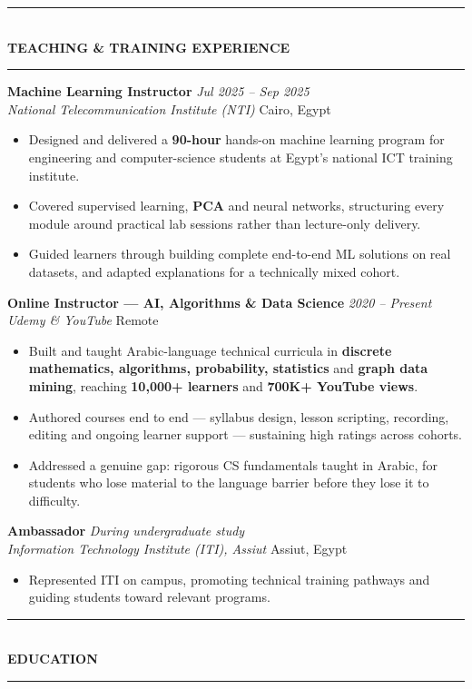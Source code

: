\documentclass[10pt, a4paper]{article}
\newcommand{\cvsection}[1]{%
  \vspace{3pt}%
  {\color{navy}\rule{\linewidth}{1.1pt}}\\[0.5pt]%
  {\color{navy}\bfseries\fontsize{9.5}{11}\selectfont\uppercase{#1}}\\[-4pt]%
  {\color{teal}\rule{\linewidth}{0.6pt}}%
  \vspace{2pt}%
}
\newcommand{\cventry}[4]{%
  \vspace{2.5pt}%
  \textbf{\color{darkgray}#1} \hfill {\color{midgray}\textit{#3}}\\[-1.5pt]%
  {\color{teal}\textit{#2}} \hfill {\color{midgray}#4}%
}
\newenvironment{cvitems}{%
  \begin{itemize}[leftmargin=11pt, itemsep=0.5pt, parsep=0pt, topsep=1pt,
                  label={\textcolor{teal}{$\bullet$}}]
}{%
  \end{itemize}%
}
\begin{document}
\cvsection{Teaching \& Training Experience}

\cventry{Machine Learning Instructor}{National Telecommunication Institute (NTI)}
        {Jul 2025 -- Sep 2025}{Cairo, Egypt}
\begin{cvitems}
  \item Designed and delivered a \textbf{90-hour} hands-on machine learning program for engineering and computer-science students at Egypt's national ICT training institute.
  \item Covered supervised learning, \textbf{PCA} and neural networks, structuring every module around practical lab sessions rather than lecture-only delivery.
  \item Guided learners through building complete end-to-end ML solutions on real datasets, and adapted explanations for a technically mixed cohort.
\end{cvitems}

\cventry{Online Instructor --- AI, Algorithms \& Data Science}{Udemy \& YouTube}
        {2020 -- Present}{Remote}
\begin{cvitems}
  \item Built and taught Arabic-language technical curricula in \textbf{discrete mathematics, algorithms, probability, statistics} and \textbf{graph data mining}, reaching \textbf{10,000+ learners} and \textbf{700K+ YouTube views}.
  \item Authored courses end to end --- syllabus design, lesson scripting, recording, editing and ongoing learner support --- sustaining high ratings across cohorts.
  \item Addressed a genuine gap: rigorous CS fundamentals taught in Arabic, for students who lose material to the language barrier before they lose it to difficulty.
\end{cvitems}

\cventry{Ambassador}{Information Technology Institute (ITI), Assiut}
        {During undergraduate study}{Assiut, Egypt}
\begin{cvitems}
  \item Represented ITI on campus, promoting technical training pathways and guiding students toward relevant programs.
\end{cvitems}

\cvsection{Education}
\end{document}
